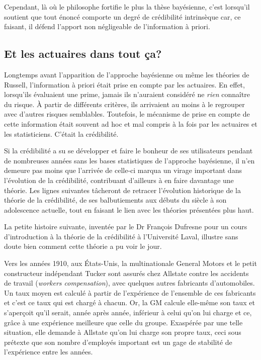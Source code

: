 Cependant, là où le philosophe fortifie le plus la thèse bayésienne,
c'est lorsqu'il soutient que tout énoncé comporte un degré de
crédibilité intrinsèque car, ce faisant, il défend l'apport non
négligeable de l'information à priori.

\subsection{Et les actuaires dans tout ça?}

Longtemps avant l'apparition de l'approche bayésienne ou même les
théories de Russell, l'information à priori était prise en compte par
les actuaires. En effet, lorsqu'ils évaluaient une prime, jamais ils
n'auraient considéré ne \emph{rien} connaître du risque. À partir de
différents critères, ils arrivaient au moins à le regrouper avec
d'autres risques semblables. Toutefois, le mécanisme de prise en
compte de cette information était souvent ad hoc et mal compris à
la fois par les actuaires et les statisticiens. C'était la
crédibilité.

Si la crédibilité a su se développer et faire le bonheur de ses
utilisateurs pendant de nombreuses années sans les bases statistiques
de l'approche bayésienne, il n'en demeure pas moins que l'arrivée de
celle-ci marqua un virage important dans l'évolution de la
crédibilité, contribuant d'ailleurs à en faire davantage une théorie.
Les lignes suivantes tâcheront de retracer l'évolution historique de
la théorie de la crédibilité, de ses balbutiements aux débuts du
siècle à son adolescence actuelle, tout en faisant le lien avec les
théories présentées plus haut.

La petite histoire suivante, inventée par le Dr François Dufresne pour
un cours d'introduction à la théorie de la crédibilité à l'Université
Laval, illustre sans doute bien comment cette théorie a pu voir le
jour.

Vers les années 1910, aux États-Unis, la multinationale General Motors
et le petit constructeur indépendant Tucker sont assurés chez Allstate
contre les accidents de travail (\emph{workers compensation}), avec
quelques autres fabricants d'automobiles. Un taux moyen est calculé à
partir de l'expérience de l'ensemble de ces fabricants et c'est ce
taux qui est chargé à chacun. Or, la GM calcule elle-même son taux et
s'aperçoit qu'il serait, année après année, inférieur à celui qu'on
lui charge et ce, grâce à une expérience meilleure que celle du
groupe. Exaspérée par une telle situation, elle demande à Allstate
qu'on lui charge son propre taux, ceci sous prétexte que son nombre
d'employés important est un gage de stabilité de l'expérience entre
les années.

